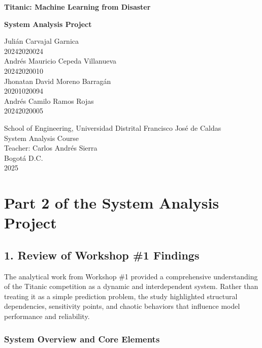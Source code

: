 \documentclass[12pt]{report}
\begin{document}
\begin{titlepage}
    \centering
    
    {\Large \textbf{Titanic: Machine Learning from Disaster} \par}
    \vspace{0.5cm}
    {\large \textbf{System Analysis Project} \par}
    \vspace{3cm}

    {\large 
    Julián Carvajal Garnica \\ 
    20242020024 \\[0.5cm]
    Andrés Mauricio Cepeda Villanueva \\
    20242020010 \\[0.5cm]
    Jhonatan David Moreno Barragán \\
    20201020094 \\[0.5cm]
    Andrés Camilo Ramos Rojas \\
    20242020005
    }
    
    \vfill
    
    School of Engineering, Universidad Distrital Francisco José de Caldas \\
    System Analysis Course \\
    Teacher: Carlos Andrés Sierra \\
    Bogotá D.C. \\
    2025
    
\end{titlepage}

\chapter*{Part 2 of the System Analysis Project}

\section*{1. Review of Workshop \#1 Findings}

The analytical work from Workshop \#1 provided a comprehensive understanding of the Titanic competition as a dynamic and interdependent system. Rather than treating it as a simple prediction problem, the study highlighted structural dependencies, sensitivity points, and chaotic behaviors that influence model performance and reliability.

\subsection*{System Overview and Core Elements}
\end{document}
